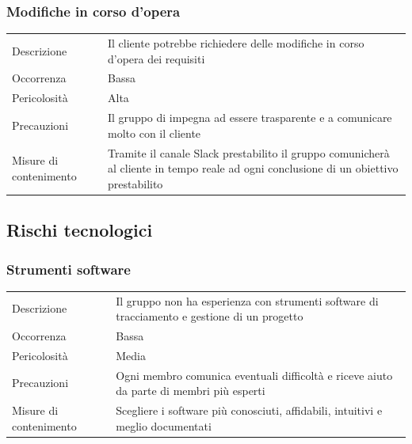 \documentclass{article}
\begin{document}
\subsubsection{Modifiche in corso d'opera}
\begin{center}
\begin{tabular}{P{10em} P{20em}} 
     Descrizione & Il cliente potrebbe richiedere delle modifiche in corso d'opera dei requisiti\\ 
    Occorrenza & Bassa\\
    Pericolosità & Alta \\
    Precauzioni & Il gruppo di impegna ad essere trasparente e a comunicare molto con il cliente \\
    Misure di contenimento & Tramite il canale Slack prestabilito il gruppo comunicherà al cliente in tempo reale ad ogni conclusione di un obiettivo prestabilito \\
\end{tabular}
\label{tab:modifiche}
\end{center}

\subsection{Rischi tecnologici}
\subsubsection{Strumenti software}
\begin{center}
\begin{tabular}{P{10em} P{20em}} 
     Descrizione & Il gruppo non ha esperienza con strumenti software di tracciamento e gestione di un progetto\\ 
    Occorrenza & Bassa\\
    Pericolosità & Media \\
    Precauzioni & Ogni membro comunica eventuali difficoltà e riceve aiuto da parte di membri più esperti \\
    Misure di contenimento & Scegliere i software più conosciuti, affidabili, intuitivi e meglio documentati \\
\end{tabular}
\label{tab:sofrware}
\end{center}
\end{document}

